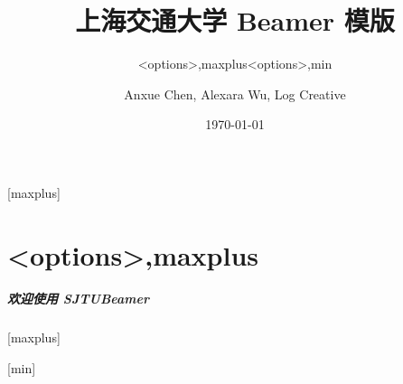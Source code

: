 \documentclass[
    aspectratio=169
]{ctexbeamer}
\begin{document}
\title[SJTU Beamer Template] %
{\textbf{上海交通大学 Beamer 模版}} %

\author[Anxue Chen, Alexara Wu, Log Creative]
{Anxue Chen, Alexara Wu, Log Creative}


\date{\today}

\subtitle{<options>,maxplus}
\logo{\resizebox{!}{0.7cm}{\cnlogo}}
[maxplus]
\maketitle
\part{<options>,maxplus}
\begin{frame}
  \frametitle{欢迎使用 SJTUBeamer}
\end{frame}
[maxplus]
\makebottom

\subtitle{<options>,min}
\logo{\resizebox{!}{0.7cm}{\enlogo}}
[min]
\maketitle
\end{document}
